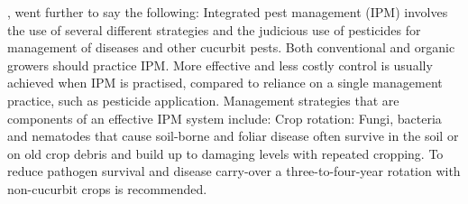 \citep{johnPumpkinSquashDiseases2019a}, went further to say the following: 
Integrated pest management (IPM) involves the use of several different strategies and the judicious use of pesticides for management of diseases and other cucurbit pests. Both conventional and organic growers should practice IPM. More effective and less costly control is usually achieved when IPM is practised, compared to reliance on a single management practice, such as pesticide application. Management strategies that are components of an effective IPM system include: 
Crop rotation: Fungi, bacteria and nematodes that cause soil-borne and foliar disease often survive in the soil or on old crop debris and build up to damaging levels with repeated cropping. To reduce pathogen survival and disease carry-over a three-to-four-year rotation with non-cucurbit crops is recommended. 

